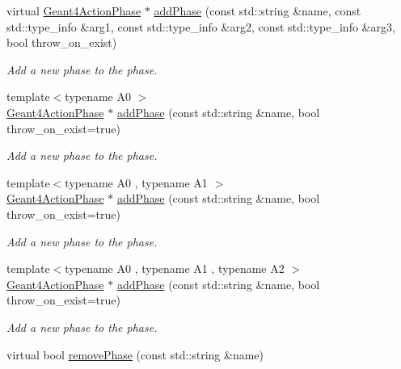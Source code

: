 \begin{DoxyCompactItemize}
virtual \hyperlink{class_d_d4hep_1_1_simulation_1_1_geant4_action_phase}{Geant4\+Action\+Phase} $\ast$ \hyperlink{class_d_d4hep_1_1_simulation_1_1_geant4_kernel_a7b04d88f6257e121268032dfe2bdc2d4}{add\+Phase} (const std\+::string \&name, const std\+::type\+\_\+info \&arg1, const std\+::type\+\_\+info \&arg2, const std\+::type\+\_\+info \&arg3, bool throw\+\_\+on\+\_\+exist)
\begin{DoxyCompactList}\small\item\em Add a new phase to the phase. \end{DoxyCompactList}\item 
{\footnotesize template$<$typename A0 $>$ }\\\hyperlink{class_d_d4hep_1_1_simulation_1_1_geant4_action_phase}{Geant4\+Action\+Phase} $\ast$ \hyperlink{class_d_d4hep_1_1_simulation_1_1_geant4_kernel_a9911ca521ebd05a1126fb04adbf3f0b2}{add\+Phase} (const std\+::string \&name, bool throw\+\_\+on\+\_\+exist=true)
\begin{DoxyCompactList}\small\item\em Add a new phase to the phase. \end{DoxyCompactList}\item 
{\footnotesize template$<$typename A0 , typename A1 $>$ }\\\hyperlink{class_d_d4hep_1_1_simulation_1_1_geant4_action_phase}{Geant4\+Action\+Phase} $\ast$ \hyperlink{class_d_d4hep_1_1_simulation_1_1_geant4_kernel_a7b0facce444f94e34bf9828d8b418e44}{add\+Phase} (const std\+::string \&name, bool throw\+\_\+on\+\_\+exist=true)
\begin{DoxyCompactList}\small\item\em Add a new phase to the phase. \end{DoxyCompactList}\item 
{\footnotesize template$<$typename A0 , typename A1 , typename A2 $>$ }\\\hyperlink{class_d_d4hep_1_1_simulation_1_1_geant4_action_phase}{Geant4\+Action\+Phase} $\ast$ \hyperlink{class_d_d4hep_1_1_simulation_1_1_geant4_kernel_afc77080c02b923ee7ba39519e7d73acb}{add\+Phase} (const std\+::string \&name, bool throw\+\_\+on\+\_\+exist=true)
\begin{DoxyCompactList}\small\item\em Add a new phase to the phase. \end{DoxyCompactList}\item 
virtual bool \hyperlink{class_d_d4hep_1_1_simulation_1_1_geant4_kernel_a3d2e1d38ae072b26c0a9124268065fbc}{remove\+Phase} (const std\+::string \&name)

\end{DoxyCompactItemize}
